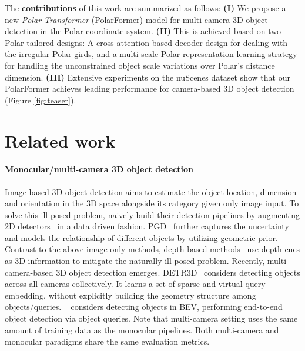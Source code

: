 \documentclass[letterpaper]{article} \usepackage{aaai23}  \usepackage{times}  \usepackage{helvet}  \usepackage{courier}  \usepackage[hyphens]{url}  \usepackage{graphicx} \urlstyle{rm} \def\UrlFont{\rm}  \usepackage{natbib}  \usepackage{caption} \frenchspacing  \setlength{\pdfpagewidth}{8.5in} \setlength{\pdfpageheight}{11in} \usepackage{algorithm}
\begin{document}
The {\bf contributions} of this work are summarized as follows: 
\textbf{(I)}
We propose a new {\em Polar Transformer} (PolarFormer) model for multi-camera 3D object detection in the Polar coordinate system.
\textbf{(II)}
This is achieved based on two Polar-tailored designs:
A cross-attention based decoder design
for dealing with the irregular Polar girds,
and a multi-scale Polar representation learning strategy
for handling the unconstrained object scale variations over Polar's distance dimension.
\textbf{(III)}
Extensive experiments on the nuScenes dataset show that our PolarFormer achieves leading performance for camera-based 3D object detection (Figure \ref{fig:teaser}). \section{Related work}

\paragraph{Monocular/multi-camera 3D object detection}
Image-based 3D object detection aims to estimate the object location, dimension and orientation in the 3D space alongside its category given only image input.
To solve this ill-posed problem, 
\cite{zhou2019objects,wang2021fcos3d} naively build their detection pipelines by augmenting 2D detectors~\cite{zhou2019objects,tian2019fcos} in a data driven fashion.
PGD~\cite{wang2022probabilistic} further captures the uncertainty and models the relationship of different objects by utilizing geometric prior. 
Contrast to the above image-only methods, depth-based methods~\cite{xu2018multi,ding2020learning,wang2019pseudo,you2019pseudo,ma2019accurate,reading2021categorical} use depth cues as 3D information to mitigate the naturally ill-posed problem.
Recently, multi-camera-based 3D object detection emerges. DETR3D~\cite{wang2022detr3d} considers detecting objects across all cameras collectively. 
It learns a set of sparse and virtual query embedding, without explicitly building the geometry structure among objects/queries. 
~\cite{li2022bevformer} considers detecting objects in BEV,
performing end-to-end object detection via object queries.
Note that multi-camera setting uses the same amount of training data as the monocular pipelines.
Both multi-camera and monocular paradigms share the same evaluation metrics.
\end{document}
